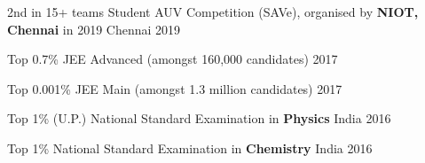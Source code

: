 \begin{cvhonors}

  \cvhonor
    {2nd in 15+ teams}
    {Student AUV Competition (SAVe), \break organised by\textbf{ NIOT, Chennai} in 2019} 
    {Chennai} 
    {2019}
 
  \cvhonor
  {Top 0.7\%}
  {JEE Advanced (amongst 160,000 candidates)}
  {}
  {2017}

  \cvhonor
  {Top 0.001\%}
  {JEE Main (amongst 1.3 million candidates)}
  {}
  {2017}
  
  \cvhonor
  {Top 1\% (U.P.)} 
  {National Standard Examination in \textbf{Physics}}
  {India}
  {2016}
 
  \cvhonor
  {Top 1\%} 
  {National Standard Examination in \textbf{Chemistry}}
  {India}
  {2016}

\end{cvhonors}

